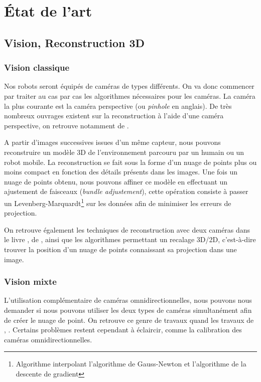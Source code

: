 \section{État de l'art}
\label{sec:etatart}

\subsection{Vision, Reconstruction 3D}

\subsubsection{Vision classique}

Nos robots seront équipés de caméras de types différents.
On va donc commencer par traiter au cas par cas les algorithmes nécessaires pour les caméras.
La caméra la plus courante est la caméra perspective (ou \textit{pinhole} en anglais).
De très nombreux ouvrages existent sur la reconstruction à l'aide d'une caméra perspective, on retrouve notamment   de \citeauthor{Hartley03Book} \cite{Hartley03Book}.

A partir d'images successives issues d'un même capteur, nous pouvons reconstruire un modèle 3D de l'environnement parcouru par un humain ou un robot mobile.
La reconstruction se fait sous la forme d'un nuage de points plus ou moins compact en fonction des détails présents dans les images.
Une fois un nuage de points obtenu, nous pouvons affiner ce modèle en effectuant un ajustement de faisceaux (\textit{bundle adjustement}), cette opération consiste à passer un Levenberg-Marquardt\footnote{Algorithme interpolant l'algorithme de Gauss-Newton et l'algorithme de la descente de gradient} sur les données afin de minimiser les erreurs de projection.

On retrouve également les techniques de reconstruction avec deux caméras dans le livre \cite{HoraudBook},  de \citeauthor{HoraudBook}, ainsi que les algorithmes permettant un recalage 3D/2D, c’est-à-dire trouver la position d'un nuage de points connaissant sa projection dans une image.

\subsubsection{Vision mixte}

L'utilisation complémentaire de caméras omnidirectionnelles, nous pouvons nous demander si nous pouvons utiliser les deux types de caméras simultanément afin de créer le nuage de point.
On retrouve ce genre de travaux quand les travaux de
\citeauthor{Sturm02},  \cite{Sturm02}.
Certains problèmes restent cependant à éclaircir, comme la calibration des caméras omnidirectionnelles.

